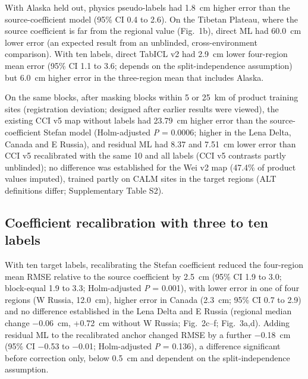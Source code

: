 With Alaska held out, physics pseudo-labels had 1.8~cm higher error than the source-coefficient model (95\% CI 0.4 to 2.6).
On the Tibetan Plateau, where the source coefficient is far from the regional value (Fig.~1b), direct ML had 60.0~cm lower error (an expected result from an unblinded, cross-environment comparison).
With ten labels, direct TabICL v2 had 2.9~cm lower four-region mean error (95\% CI 1.1 to 3.6; depends on the split-independence assumption) but 6.0~cm higher error in the three-region mean that includes Alaska.

On the same blocks, after masking blocks within 5 or 25~km of product training sites (registration deviation; designed after earlier results were viewed), the existing CCI v5 map without labels had 23.79~cm higher error than the source-coefficient Stefan model (Holm-adjusted \textit{P} = 0.0006; higher in the Lena Delta, Canada and E Russia), and residual ML had 8.37 and 7.51~cm lower error than CCI v5 recalibrated with the same 10 and all labels (CCI v5 contrasts partly unblinded); no difference was established for the Wei v2 map (47.4\% of product values imputed), trained partly on CALM sites in the target regions (ALT definitions differ; Supplementary Table S2).

\subsection{Coefficient recalibration with three to ten labels}\label{sec:results-recal}

With ten target labels, recalibrating the Stefan coefficient reduced the four-region mean RMSE relative to the source coefficient by 2.5~cm (95\% CI 1.9 to 3.0; block-equal 1.9 to 3.3; Holm-adjusted \textit{P} = 0.001), with lower error in one of four regions (W Russia, 12.0~cm), higher error in Canada (2.3~cm; 95\% CI 0.7 to 2.9) and no difference established in the Lena Delta and E Russia (regional median change −0.06~cm, +0.72~cm without W Russia; Fig.~2c--f; Fig.~3a,d).
Adding residual ML to the recalibrated anchor changed RMSE by a further −0.18~cm (95\% CI −0.53 to −0.01; Holm-adjusted \textit{P} = 0.136), a difference significant before correction only, below 0.5~cm and dependent on the split-independence assumption.

